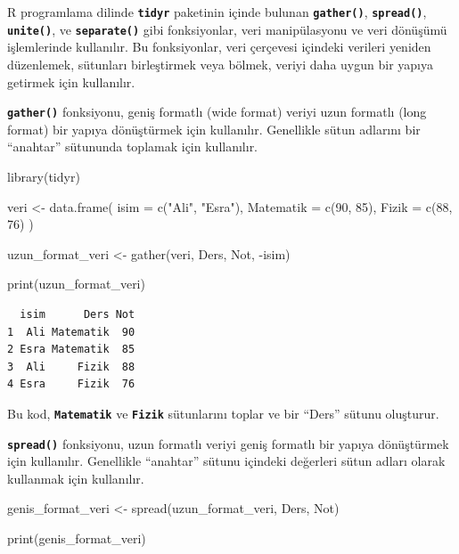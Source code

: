 \documentclass[
  letterpaper,
  DIV=11,
  numbers=noendperiod]{scrreprt}
\newenvironment{Shaded}{\begin{snugshade}}{\end{snugshade}}
\newcommand{\AttributeTok}[1]{\textcolor[rgb]{0.40,0.45,0.13}{#1}}
\newcommand{\DecValTok}[1]{\textcolor[rgb]{0.68,0.00,0.00}{#1}}
\newcommand{\FunctionTok}[1]{\textcolor[rgb]{0.28,0.35,0.67}{#1}}
\newcommand{\NormalTok}[1]{\textcolor[rgb]{0.00,0.23,0.31}{#1}}
\newcommand{\OtherTok}[1]{\textcolor[rgb]{0.00,0.23,0.31}{#1}}
\newcommand{\SpecialCharTok}[1]{\textcolor[rgb]{0.37,0.37,0.37}{#1}}
\newcommand{\StringTok}[1]{\textcolor[rgb]{0.13,0.47,0.30}{#1}}
\begin{document}
R programlama dilinde \textbf{\texttt{tidyr}} paketinin içinde bulunan
\textbf{\texttt{gather()}}, \textbf{\texttt{spread()}},
\textbf{\texttt{unite()}}, ve \textbf{\texttt{separate()}} gibi
fonksiyonlar, veri manipülasyonu ve veri dönüşümü işlemlerinde
kullanılır. Bu fonksiyonlar, veri çerçevesi içindeki verileri yeniden
düzenlemek, sütunları birleştirmek veya bölmek, veriyi daha uygun bir
yapıya getirmek için kullanılır.

\textbf{\texttt{gather()}} fonksiyonu, geniş formatlı (wide format)
veriyi uzun formatlı (long format) bir yapıya dönüştürmek için
kullanılır. Genellikle sütun adlarını bir ``anahtar'' sütununda toplamak
için kullanılır.

\begin{Shaded}
\begin{Highlighting}[]
\FunctionTok{library}\NormalTok{(tidyr)}

\NormalTok{veri }\OtherTok{\textless{}{-}} \FunctionTok{data.frame}\NormalTok{(}
  \AttributeTok{isim =} \FunctionTok{c}\NormalTok{(}\StringTok{"Ali"}\NormalTok{, }\StringTok{"Esra"}\NormalTok{),}
  \AttributeTok{Matematik =} \FunctionTok{c}\NormalTok{(}\DecValTok{90}\NormalTok{, }\DecValTok{85}\NormalTok{),}
  \AttributeTok{Fizik =} \FunctionTok{c}\NormalTok{(}\DecValTok{88}\NormalTok{, }\DecValTok{76}\NormalTok{)}
\NormalTok{)}

\NormalTok{uzun\_format\_veri }\OtherTok{\textless{}{-}} \FunctionTok{gather}\NormalTok{(veri, Ders, Not, }\SpecialCharTok{{-}}\NormalTok{isim)}

\FunctionTok{print}\NormalTok{(uzun\_format\_veri)}
\end{Highlighting}
\end{Shaded}

\begin{verbatim}
  isim      Ders Not
1  Ali Matematik  90
2 Esra Matematik  85
3  Ali     Fizik  88
4 Esra     Fizik  76
\end{verbatim}

Bu kod, \textbf{\texttt{Matematik}} ve \textbf{\texttt{Fizik}}
sütunlarını toplar ve bir ``Ders'' sütunu oluşturur.

\textbf{\texttt{spread()}} fonksiyonu, uzun formatlı veriyi geniş
formatlı bir yapıya dönüştürmek için kullanılır. Genellikle ``anahtar''
sütunu içindeki değerleri sütun adları olarak kullanmak için kullanılır.

\begin{Shaded}
\begin{Highlighting}[]
\NormalTok{genis\_format\_veri }\OtherTok{\textless{}{-}} \FunctionTok{spread}\NormalTok{(uzun\_format\_veri, Ders, Not)}

\FunctionTok{print}\NormalTok{(genis\_format\_veri)}
\end{Highlighting}
\end{Shaded}
\end{document}
